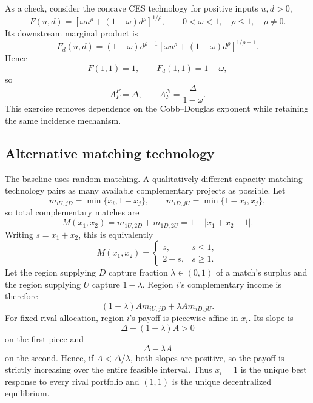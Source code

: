 As a check, consider the concave CES technology for positive inputs $u,d>0$,
\begin{equation}
F(u,d)=\left[\omega u^\rho+(1-\omega)d^\rho\right]^{1/\rho},
\qquad 0<\omega<1,\quad \rho\leq1,\quad \rho\neq0.
\end{equation}
Its downstream marginal product is
\[
F_d(u,d)
=(1-\omega)d^{\rho-1}
\left[\omega u^\rho+(1-\omega)d^\rho\right]^{1/\rho-1}.
\]
Hence
\[
F(1,1)=1,
\qquad
F_d(1,1)=1-\omega,
\]
so
\[
A_F^P=\Delta,
\qquad
A_F^N=\frac{\Delta}{1-\omega}.
\]
This exercise removes dependence on the Cobb--Douglas exponent while retaining the same incidence mechanism.

\subsection{Alternative matching technology}

The baseline uses random matching. A qualitatively different capacity-matching technology pairs as many available complementary projects as possible. Let
\begin{equation}
m_{iU,jD}=\min\{x_i,1-x_j\},
\qquad
m_{iD,jU}=\min\{1-x_i,x_j\},
\end{equation}
so total complementary matches are
\begin{equation}
M(x_1,x_2)
=m_{1U,2D}+m_{1D,2U}
=1-|x_1+x_2-1|.
\label{eq:capacity-matching}
\end{equation}
Writing $s=x_1+x_2$, this is equivalently
\begin{equation}
M(x_1,x_2)=
\begin{cases}
s, & s\leq1,\\
2-s, & s\geq1.
\end{cases}
\label{eq:capacity-matching-piecewise}
\end{equation}
Let the region supplying $D$ capture fraction $\lambda\in(0,1)$ of a match's surplus and the region supplying $U$ capture $1-\lambda$. Region $i$'s complementary income is therefore
\begin{equation}
(1-\lambda)A m_{iU,jD}+\lambda A m_{iD,jU}.
\label{eq:capacity-local-income}
\end{equation}
For fixed rival allocation, region $i$'s payoff is piecewise affine in $x_i$. Its slope is
\[
\Delta+(1-\lambda)A>0
\]
on the first piece and
\[
\Delta-\lambda A
\]
on the second. Hence, if $A<\Delta/\lambda$, both slopes are positive, so the payoff is strictly increasing over the entire feasible interval. Thus $x_i=1$ is the unique best response to every rival portfolio and $(1,1)$ is the unique decentralized equilibrium.

